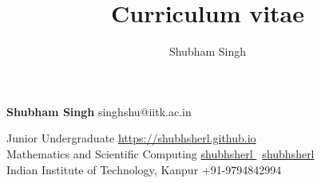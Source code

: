 \documentclass[9pt]{extarticle}
\title{Curriculum vitae}
\author{Shubham Singh}
\begin{document}

\begingroup
{}

{\Huge\textbf{\sc Shubham Singh}}
\hfill
singhshu@iitk.ac.in \faEnvelope


Junior Undergraduate
\hfill
\href{https://shubhsherl.github.io}{https://shubhsherl.github.io \faHome}\\

Mathematics and Scientific Computing
\hfill
\href{https://github.com/shubhsherl}{shubhsherl \faGithub} \textbar \ 
\href{https://www.linkedin.com/in/shubhsherl/}{shubhsherl \faLinkedin} \\

Indian Institute of Technology, Kanpur
\hfill
+91-9794842994 \faMobile \\

\begin{minipage}[t]{0.49\textwidth}
  \vspace{7mm}
  
\end{minipage}
\begin{minipage}[t]{0.49\textwidth}
  \vspace{7mm}
  
  
  
  
%   
  
  \vspace{1mm}
  
\end{minipage}
\hfill



\endgroup
\end{document}
